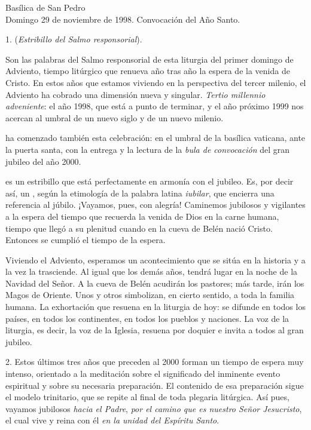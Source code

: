 Basílica de San Pedro\\ Domingo 29 de noviembre de 1998. Convocación del Año Santo.


1.  (\emph{Estribillo del Salmo responsorial}).

Son las palabras del Salmo responsorial de esta liturgia del primer domingo de Adviento, tiempo litúrgico que renueva año tras año la espera de la venida de Cristo. En estos años que estamos viviendo en la perspectiva del tercer milenio, el Adviento ha cobrado una dimensión nueva y singular. \emph{Tertio millennio adveniente}: el año 1998, que está a punto de terminar, y el año próximo 1999 nos acercan al umbral de un nuevo siglo y de un nuevo milenio.

 ha comenzado también esta celebración: en el umbral de la basílica vaticana, ante la puerta santa, con la entrega y la lectura de la \emph{bula de convocación} del gran jubileo del año 2000.

 es un estribillo que está perfectamente en armonía con el jubileo. Es, por decir así, un , según la etimología de la palabra latina \emph{iubilar}, que encierra una referencia al júbilo. ¡Vayamos, pues, con alegría! Caminemos jubilosos y vigilantes a la espera del tiempo que recuerda la venida de Dios en la carne humana, tiempo que llegó a su plenitud cuando en la cueva de Belén nació Cristo. Entonces se cumplió el tiempo de la espera.

Viviendo el Adviento, esperamos un acontecimiento que se sitúa en la historia y a la vez la trasciende. Al igual que los demás años, tendrá lugar en la noche de la Navidad del Señor. A la cueva de Belén acudirán los pastores; más tarde, irán los Magos de Oriente. Unos y otros simbolizan, en cierto sentido, a toda la familia humana. La exhortación que resuena en la liturgia de hoy:  se difunde en todos los países, en todos los continentes, en todos los pueblos y naciones. La voz de la liturgia, es decir, la voz de la Iglesia, resuena por doquier e invita a todos al gran jubileo.

2. Estos últimos tres años que preceden al 2000 forman un tiempo de espera muy intenso, orientado a la meditación sobre el significado del inminente evento espiritual y sobre su necesaria preparación. El contenido de esa preparación sigue el modelo trinitario, que se repite al final de toda plegaria litúrgica. Así pues, vayamos jubilosos \emph{hacia el Padre}, \emph{por el camino que es nuestro Señor Jesucristo}, el cual vive y reina con él \emph{en la unidad del Espíritu Santo}.

